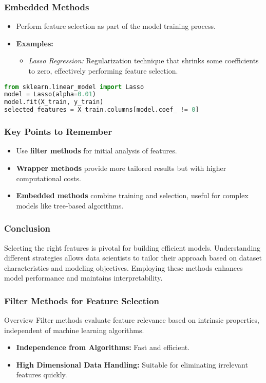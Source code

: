\documentclass[aspectratio=169]{beamer}
\begin{document}
\begin{frame}[fragile]
    \frametitle{Embedded Methods}
    \begin{itemize}
        \item Perform feature selection as part of the model training process.
        \item \textbf{Examples:}
        \begin{itemize}
            \item \textit{Lasso Regression:} Regularization technique that shrinks some coefficients to zero, effectively performing feature selection.
        \end{itemize}
    \end{itemize}
    \begin{lstlisting}[language=Python]
from sklearn.linear_model import Lasso
model = Lasso(alpha=0.01)
model.fit(X_train, y_train)
selected_features = X_train.columns[model.coef_ != 0]
    \end{lstlisting}
\end{frame}

\begin{frame}
    \frametitle{Key Points to Remember}
    \begin{itemize}
        \item Use \textbf{filter methods} for initial analysis of features.
        \item \textbf{Wrapper methods} provide more tailored results but with higher computational costs.
        \item \textbf{Embedded methods} combine training and selection, useful for complex models like tree-based algorithms.
    \end{itemize}
\end{frame}

\begin{frame}
    \frametitle{Conclusion}
    Selecting the right features is pivotal for building efficient models. Understanding different strategies allows data scientists to tailor their approach based on dataset characteristics and modeling objectives. Employing these methods enhances model performance and maintains interpretability.
\end{frame}

\begin{frame}[fragile]
    \frametitle{Filter Methods for Feature Selection}
    \begin{block}{Overview}
        Filter methods evaluate feature relevance based on intrinsic properties, independent of machine learning algorithms.
    \end{block}
    \begin{itemize}
        \item \textbf{Independence from Algorithms:} Fast and efficient.
        \item \textbf{High Dimensional Data Handling:} Suitable for eliminating irrelevant features quickly.
    \end{itemize}
\end{frame}
\end{document}
